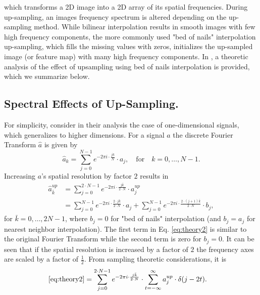 \documentclass[letterpaper]{article} %
\begin{document}
which transforms a 2D image into a 2D array of its spatial frequencies. During up-sampling, an images frequency spectrum is altered depending on the up-sampling method. While bilinear interpolation results in smooth images with few high frequency components, the more commonly used "bed of nails" interpolation up-sampling, which fills the missing values with zeros, initializes the up-sampled image (or feature map) with many high frequency components. In \cite{margret2020upconvolution}, a theoretic analysis of the effect of upsampling using bed of nails interpolation is provided, which we summarize below.
\subsection{Spectral Effects of Up-Sampling.}
For simplicity,  \cite{margret2020upconvolution} consider in their analysis the case of one-dimensional signals, which generalizes to higher dimensions. For a signal $a$ the discrete Fourier Transform $\hat{a}$ is given by
\begin{equation}
\hat{a}_k=\sum_{j=0}^{N-1}e^{-2\pi i\cdot\frac{jk}{N}}\cdot a_j, \quad \mathrm{for }\quad k=0,\dots,N-1.
\end{equation}
Increasing $a$'s spatial resolution by factor $2$ results in %
\begin{align}
\hat{a}^{up}_{\bar{k}}&=\sum_{j=0}^{2\cdot N-1}e^{-2\pi i\cdot\frac{j\bar{k}}{2\cdot N}}\cdot a^{up}_j
\nonumber\\
&=\sum_{j=0}^{N-1}e^{-2\pi i\cdot\frac{2\cdot j\bar{k}}{2\cdot N}}\cdot a_j
+ \sum_{j=0}^{N-1}e^{-2\pi i\cdot\frac{2\cdot (j+1)\bar{k}}{2\cdot N}}\cdot b_j,
\label{eq:theory2}
\end{align}
for $\bar{k}=0,\dots,2N-1$, where $b_j=0$ for "bed of nails" interpolation (and $b_j=a_j$ for nearest neighbor interpolation).
The first term in Eq. \eqref{eq:theory2} is similar to the original Fourier Transform while the second term is zero for $b_j=0$.  %
It can be seen that if the spatial resolution is increased by a factor of $2$ the frequency axes are scaled by a factor of $\frac{1}{2}$. From sampling theoretic considerations, it is \cite{margret2020upconvolution}
\begin{align}
\eqref{eq:theory2}%
&=\sum_{j=0}^{2\cdot N-1}e^{-2\pi i\cdot\frac{j\bar{k}}{2\cdot N}}\cdot \sum_{t=-\infty}^{\infty}a^{up}_j\cdot\delta(j-2t).\label{eq:theory3}
\end{align}
\end{document}
